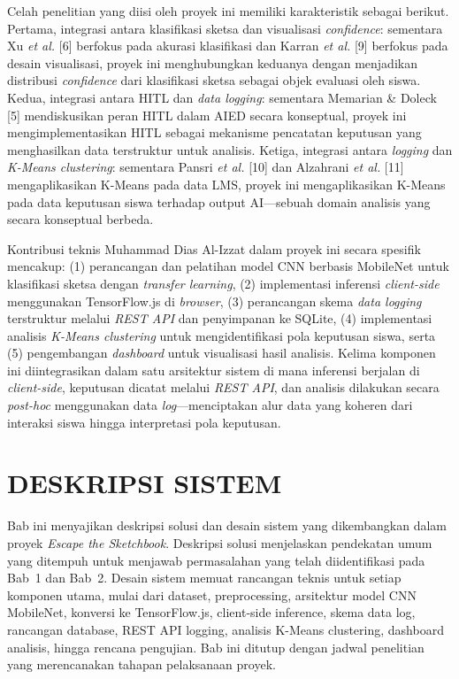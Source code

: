 \documentclass[12pt,oneside]{report}
\begin{document}
Celah penelitian yang diisi oleh proyek ini memiliki karakteristik sebagai berikut. Pertama, integrasi antara klasifikasi sketsa dan visualisasi \textit{confidence}: sementara Xu \textit{et al.} [6] berfokus pada akurasi klasifikasi dan Karran \textit{et al.} [9] berfokus pada desain visualisasi, proyek ini menghubungkan keduanya dengan menjadikan distribusi \textit{confidence} dari klasifikasi sketsa sebagai objek evaluasi oleh siswa. Kedua, integrasi antara HITL dan \textit{data logging}: sementara Memarian \& Doleck [5] mendiskusikan peran HITL dalam AIED secara konseptual, proyek ini mengimplementasikan HITL sebagai mekanisme pencatatan keputusan yang menghasilkan data terstruktur untuk analisis. Ketiga, integrasi antara \textit{logging} dan \textit{K-Means clustering}: sementara Pansri \textit{et al.} [10] dan Alzahrani \textit{et al.} [11] mengaplikasikan K-Means pada data LMS, proyek ini mengaplikasikan K-Means pada data keputusan siswa terhadap output AI—sebuah domain analisis yang secara konseptual berbeda.

Kontribusi teknis Muhammad Dias Al-Izzat dalam proyek ini secara spesifik mencakup: (1) perancangan dan pelatihan model CNN berbasis MobileNet untuk klasifikasi sketsa dengan \textit{transfer learning}, (2) implementasi inferensi \textit{client-side} menggunakan TensorFlow.js di \textit{browser}, (3) perancangan skema \textit{data logging} terstruktur melalui \textit{REST API} dan penyimpanan ke SQLite, (4) implementasi analisis \textit{K-Means clustering} untuk mengidentifikasi pola keputusan siswa, serta (5) pengembangan \textit{dashboard} untuk visualisasi hasil analisis. Kelima komponen ini diintegrasikan dalam satu arsitektur sistem di mana inferensi berjalan di \textit{client-side}, keputusan dicatat melalui \textit{REST API}, dan analisis dilakukan secara \textit{post-hoc} menggunakan data \textit{log}—menciptakan alur data yang koheren dari interaksi siswa hingga interpretasi pola keputusan.


\chapter{DESKRIPSI SISTEM}
\label{chap:bab3}

Bab ini menyajikan deskripsi solusi dan desain sistem yang dikembangkan dalam proyek \textit{Escape the Sketchbook}. Deskripsi solusi menjelaskan pendekatan umum yang ditempuh untuk menjawab permasalahan yang telah diidentifikasi pada Bab~1 dan Bab~2. Desain sistem memuat rancangan teknis untuk setiap komponen utama, mulai dari dataset, preprocessing, arsitektur model CNN MobileNet, konversi ke TensorFlow.js, client-side inference, skema data log, rancangan database, REST API logging, analisis K-Means clustering, dashboard analisis, hingga rencana pengujian. Bab ini ditutup dengan jadwal penelitian yang merencanakan tahapan pelaksanaan proyek.
\end{document}
